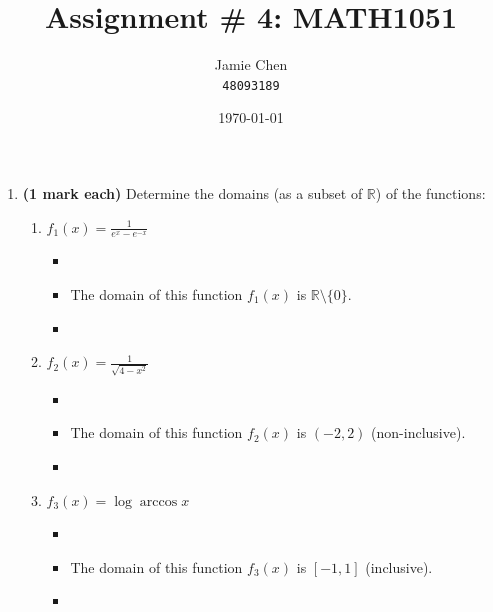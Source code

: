 \documentclass[12pt]{report}
\title{Assignment \# 4: MATH1051}
\author{Jamie Chen\\ \text{Student Number:} \texttt{48093189} \\ \text{Semester 2, 2023}}
\date{\today}
\begin{document}
\maketitle
\begin{enumerate}[leftmargin=\labelsep]

    \item {\bf (1 mark each)} Determine the domains (as a subset of $\mathbb{R}$) of the functions:
        \begin{enumerate}
            \item $f_1(x)=\frac{1}{e^x-e^{-x}}$
                \begin{itemize}[label={}]
                    \item 
                    \item The domain of this function $f_1(x)$ is $\mathbb{R} \setminus \{0\}$.
                    \item 
                \end{itemize}
            \item $f_2(x)=\frac{1}{\sqrt{4-x^2}}$
                \begin{itemize}[label={}]
                    \item
                    \item The domain of this function $f_2(x)$ is $(-2,2)$ (non-inclusive).
                    \item 
                \end{itemize}
            \item $f_3(x)= \log \arccos x$ 
                \begin{itemize}[label={}]
                    \item
                    \item The domain of this function $f_3(x)$ is $[-1,1]$ (inclusive). 
                    \item 
                \end{itemize}
        \end{enumerate}
            
\newpage


\end{enumerate}
\end{document}
